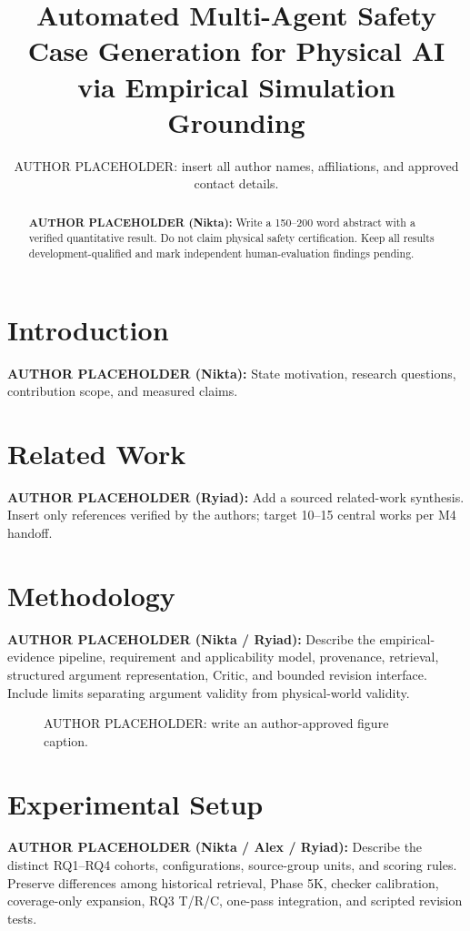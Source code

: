 \documentclass{article}
\title{Automated Multi-Agent Safety Case Generation for Physical AI via Empirical Simulation Grounding}
\author{AUTHOR PLACEHOLDER: insert all author names, affiliations, and approved contact details.}
\begin{document}
\maketitle

\begin{abstract}
\textbf{AUTHOR PLACEHOLDER (Nikta):} Write a 150--200 word abstract with a verified quantitative result. Do not claim physical safety certification. Keep all results development-qualified and mark independent human-evaluation findings pending.
\end{abstract}

\section{Introduction}
\textbf{AUTHOR PLACEHOLDER (Nikta):} State motivation, research questions, contribution scope, and measured claims.

\section{Related Work}
\textbf{AUTHOR PLACEHOLDER (Ryiad):} Add a sourced related-work synthesis. Insert only references verified by the authors; target 10--15 central works per M4 handoff.

\section{Methodology}
\textbf{AUTHOR PLACEHOLDER (Nikta / Ryiad):} Describe the empirical-evidence pipeline, requirement and applicability model, provenance, retrieval, structured argument representation, Critic, and bounded revision interface. Include limits separating argument validity from physical-world validity.

\begin{figure}[t]
\centering
{}
\caption{AUTHOR PLACEHOLDER: write an author-approved figure caption.}
\label{fig:workflow}
\end{figure}

\section{Experimental Setup}
\textbf{AUTHOR PLACEHOLDER (Nikta / Alex / Ryiad):} Describe the distinct RQ1--RQ4 cohorts, configurations, source-group units, and scoring rules. Preserve differences among historical retrieval, Phase 5K, checker calibration, coverage-only expansion, RQ3 T/R/C, one-pass integration, and scripted revision tests.
\end{document}
